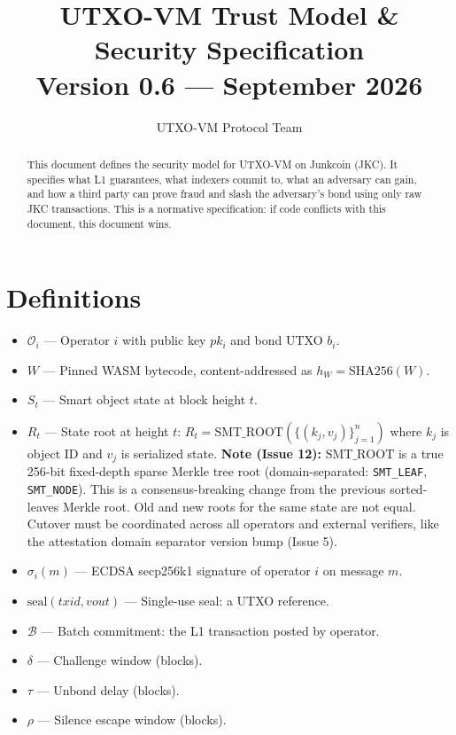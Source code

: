 \documentclass[a4paper,11pt]{article}
\title{\textbf{UTXO-VM Trust Model \& Security Specification}\\[0.3em]
\large Version 0.6 --- September 2026}
\author{UTXO-VM Protocol Team}
\date{}
\begin{document}
\maketitle

\begin{abstract}
This document defines the security model for UTXO-VM on Junkcoin (JKC). It specifies what L1 guarantees, what indexers commit to, what an adversary can gain, and how a third party can prove fraud and slash the adversary's bond using only raw JKC transactions. This is a normative specification: if code conflicts with this document, this document wins.
\end{abstract}

\section{Definitions}

\begin{itemize}[nosep]
    \item $\mathcal{O}_i$ --- Operator $i$ with public key $pk_i$ and bond UTXO $b_i$.
    \item $W$ --- Pinned WASM bytecode, content-addressed as $h_W = \text{SHA256}(W)$.
    \item $S_t$ --- Smart object state at block height $t$.
    \item $R_t$ --- State root at height $t$: $R_t = \text{SMT\_ROOT}(\{(k_j, v_j)\}_{j=1}^{n})$ where $k_j$ is object ID and $v_j$ is serialized state. \textbf{Note (Issue 12):} $\text{SMT\_ROOT}$ is a true 256-bit fixed-depth sparse Merkle tree root (domain-separated: \texttt{SMT\_LEAF}, \texttt{SMT\_NODE}). This is a consensus-breaking change from the previous sorted-leaves Merkle root. Old and new roots for the same state are not equal. Cutover must be coordinated across all operators and external verifiers, like the attestation domain separator version bump (Issue 5).
    \item $\sigma_i(m)$ --- ECDSA secp256k1 signature of operator $i$ on message $m$.
    \item $\text{seal}(txid, vout)$ --- Single-use seal: a UTXO reference.
    \item $\mathcal{B}$ --- Batch commitment: the L1 transaction posted by operator.
    \item $\delta$ --- Challenge window (blocks).
    \item $\tau$ --- Unbond delay (blocks).
    \item $\rho$ --- Silence escape window (blocks).
\end{itemize}
\end{document}
